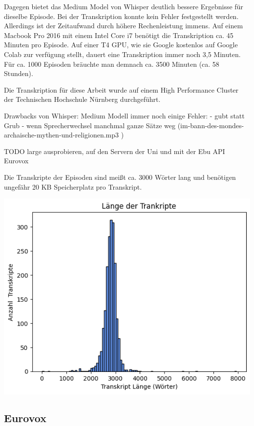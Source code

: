 Dagegen bietet das Medium Model von Whisper deutlich bessere Ergebnisse für dieselbe Episode. 
Bei der Transkription konnte kein Fehler festgestellt werden. 
Allerdings ist der Zeitaufwand durch höhere Rechenleistung immens. 
Auf einem Macbook Pro 2016 mit einem Intel Core i7 benötigt die Transkription ca. 45 Minuten pro Episode. 
Auf einer T4 GPU, wie sie Google kostenlos auf Google Colab zur verfügung stellt, dauert eine Transkription immer noch 3,5 Minuten. 
Für ca. 1000 Episoden bräuchte man demnach ca. 3500 Minuten (ca. 58 Stunden). 

Die Transkription für diese Arbeit wurde auf einem High Performance Cluster der Technischen Hochschule Nürnberg durchgeführt.


Drawbacks von Whisper:
Medium Modell immer noch einige Fehler: 
- gubt statt Grub
- wenn Sprecherwechsel manchmal ganze Sätze weg (im-bann-des-mondes-archaische-mythen-und-religionen.mp3	)

TODO large ausprobieren, auf den Servern der Uni und mit der Ebu API
Eurovox


Die Transkripte der Episoden sind meißt ca. 3000 Wörter lang und benötigen ungefähr 20 KB Speicherplatz pro Transkript.

\includegraphics[width=\linewidth]{figures/transcript_length.png}


\subsection{Eurovox}

